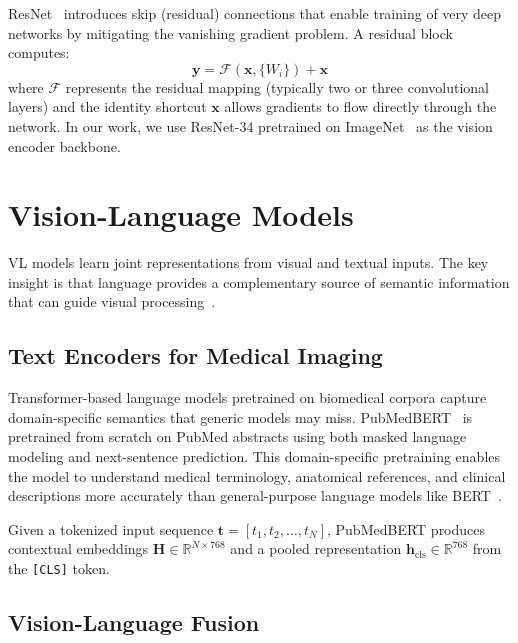\ac{ResNet}~\cite{he2016deep} introduces skip (residual) connections that enable training of very deep networks by mitigating the vanishing gradient problem. A residual block computes:
\begin{equation}
	\mathbf{y} = \mathcal{F}(\mathbf{x}, \{W_i\}) + \mathbf{x}
\end{equation}
where $\mathcal{F}$ represents the residual mapping (typically two or three convolutional layers) and the identity shortcut $\mathbf{x}$ allows gradients to flow directly through the network. In our work, we use ResNet-34 pretrained on ImageNet~\cite{deng2009imagenet} as the vision encoder backbone.


\section{Vision-Language Models}
\label{sec:bg:vlmodels}

\ac{VL} models learn joint representations from visual and textual inputs. The key insight is that language provides a complementary source of semantic information that can guide visual processing~\cite{radford2021clip}.

\subsection{Text Encoders for Medical Imaging}
\label{sec:bg:textenc}

Transformer-based language models pretrained on biomedical corpora capture domain-specific semantics that generic models may miss. \ac{PubMedBERT}~\cite{gu2021pubmedbert} is pretrained from scratch on PubMed abstracts using both masked language modeling and next-sentence prediction. This domain-specific pretraining enables the model to understand medical terminology, anatomical references, and clinical descriptions more accurately than general-purpose language models like BERT~\cite{devlin2019bert}.

Given a tokenized input sequence $\mathbf{t} = [t_1, t_2, \ldots, t_N]$, PubMedBERT produces contextual embeddings $\mathbf{H} \in \mathbb{R}^{N \times 768}$ and a pooled representation $\mathbf{h}_{\text{cls}} \in \mathbb{R}^{768}$ from the \texttt{[CLS]} token.

\subsection{Vision-Language Fusion}
\label{sec:bg:fusion}

